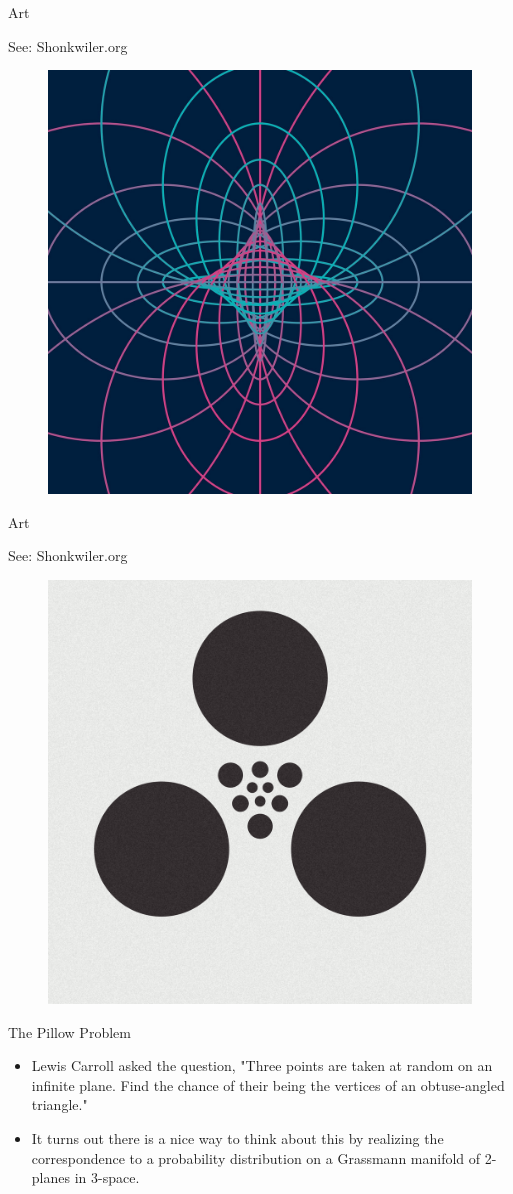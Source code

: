 \documentclass[usenames,dvipsnames]{beamer}
\theoremstyle{definition}
\theoremstyle{theorem}
\begin{document}
    \begin{frame}{Art}
    \begin{center}
        See: Shonkwiler.org
        \begin{figure}
            \centering
            \includegraphics[width=.6\textwidth]{Recruitment_Day/37205108544_283ce78bbf_b.jpg}
        \end{figure}
        \end{center}
    \end{frame}
    
        \begin{frame}{Art}
    \begin{center}
        See: Shonkwiler.org
        \begin{figure}
            \centering
            \includegraphics[width=.6\textwidth]{Recruitment_Day/platonic5.png}
        \end{figure}
        \end{center}
    \end{frame}
    
    \begin{frame}{The Pillow Problem}
    \begin{itemize}
        \item Lewis Carroll asked the question, "Three points are taken at random on an infinite plane. Find the chance of their being the vertices of an obtuse-angled triangle."
        \item It turns out there is a nice way to think about this by realizing the correspondence to a probability distribution on a Grassmann manifold of 2-planes in 3-space.
    \end{itemize}

    \end{frame}
        
\end{document}
